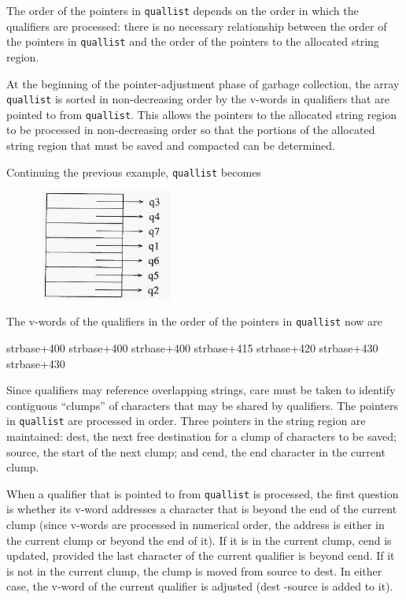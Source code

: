 The order of the pointers in \texttt{quallist} depends on the order in
which the qualifiers are processed: there is no necessary relationship
between the order of the pointers in \texttt{quallist} and the order
of the pointers to the allocated string region.


At the beginning of the pointer-adjustment phase of garbage
collection, the array \texttt{quallist} is sorted in non-decreasing
order by the v-words in qualifiers that are pointed to from
\texttt{quallist}. This allows the pointers to the allocated string
region to be processed in non-decreasing order so that the portions of
the allocated string region that must be saved and compacted can be
determined.


Continuing the previous example, \texttt{quallist} becomes


\ \ \ \ \ \  \includegraphics[width=1.8161in,height=1.4319in]{ib-img/ib-img099.jpg} 


The v-words of the qualifiers in the order of the pointers in
\texttt{quallist} now are


strbase+400\newline
strbase+400\newline
strbase+400\newline
strbase+415\newline
strbase+420\newline
strbase+430\newline
strbase+430


Since qualifiers may reference overlapping strings, care must be taken
to identify contiguous ``clumps'' of characters that may be shared by
qualifiers. The pointers in \texttt{quallist} are processed in
order. Three pointers in the string region are maintained: dest, the
next free destination for a clump of characters to be saved; source,
the start of the next clump; and cend, the end character in the
current clump.

When a qualifier that is pointed to from \texttt{quallist} is
processed, the first question is whether its v-word addresses a
character that is beyond the end of the current clump (since v-words
are processed in numerical order, the address is either in the current
clump or beyond the end of it). If it is in the current clump, cend is
updated, provided the last character of the current qualifier is
beyond cend. If it is not in the current clump, the clump is moved
from source to dest. In either case, the v-word of the current
qualifier is adjusted (dest -source is added to it).

